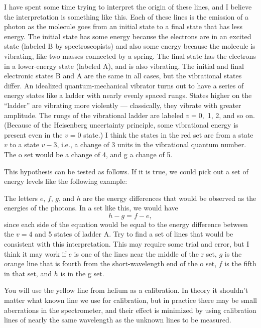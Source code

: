 I have spent some time
trying to interpret the origin of these lines, and I believe the interpretation
is something like this. Each of these lines is the emission of a photon as
the molecule goes from an initial state to a final state that has less energy.
The initial state has some energy because the electrons are in an excited state
(labeled B by spectroscopists) and also some energy because the molecule is vibrating,
like two masses connected by a spring. The final state has the electrons in
a lower-energy state (labeled A), and is also vibrating. The initial and final
electronic states B and A are the same in all cases, but the vibrational states
differ. An idealized quantum-mechanical vibrator turns out to have a series of
energy states like a ladder with nearly evenly spaced rungs. States higher on
the ``ladder'' are vibrating more violently --- classically, they vibrate with
greater amplitude. The rungs of the vibrational ladder are labeled $v=0,$ 1, 2, and so on.
(Because of the Heisenberg uncertainty principle, some vibrational energy is present
even in the $v=0$ state.) I think the states in the red set are from a state $v$ to
a state $v-3$, i.e., a change of 3 units in the vibrational quantum number. The o
set would be a change of 4, and g a change of 5.

This hypothesis can be tested as follows. If it is true, we could pick out a set of
energy levels like the following example:


The letters $e$, $f$, $g$, and $h$ are the energy differences that would be observed
as the energies of the photons. In a set like this, we would have
\begin{equation*}
  h-g = f-e,
\end{equation*}
since each side of the equation would be equal to the energy difference between the
$v=4$ and 5 states of ladder A. Try to find a set of lines that
would be consistent with this interpretation. This may require some trial and
error, but I think it may work if $e$ is one of the lines near the middle of the
r set, $g$ is the orange line that is fourth from the short-wavelength end
of the o set, $f$ is the fifth in that set, and $h$ is in the g set.


You will use the yellow line from helium as a calibration.
In theory it shouldn't matter what known line we use for calibration, but in practice
there may be small aberrations in the spectrometer, and their effect is minimized by
using calibration lines of nearly the same wavelength as the unknown lines to be measured.

